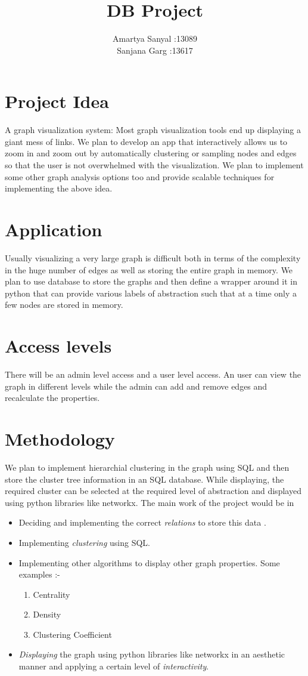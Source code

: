 \documentclass{article}
\title{DB Project}
\author{Amartya Sanyal :13089 \\ Sanjana Garg :13617}
\begin{document}
\maketitle
\section{Project Idea}
A graph visualization system: Most graph visualization tools end up displaying a giant mess of links. We plan to develop an app that interactively allows us to zoom in and zoom out by  automatically clustering or sampling nodes and edges so that the user is not overwhelmed with the visualization. We plan to implement some other graph analysis options too and provide scalable techniques for implementing the above idea.

\section{Application}
Usually visualizing a very large graph is difficult both in terms of the complexity in the huge number of edges as well as storing the entire graph in memory. We plan to use database to store the graphs and then define a wrapper around it in python that can provide various labels of abstraction such that at a time only a few nodes are stored in memory. 

\section{Access levels}
There will be an admin level access and a user level access. An user can view the graph in different levels while the admin can add and remove edges and recalculate the properties.

\section{Methodology}
We plan to implement hierarchial clustering in the graph using SQL and then store the cluster tree information in an SQL database. While displaying, the required cluster can be selected at the required level of abstraction and displayed using python libraries like networkx. The main work of the project would be in
\begin{itemize}
\item Deciding and implementing the correct \textit{relations} to  store this data .
\item Implementing \textit{clustering} using SQL.
\item Implementing other algorithms to  display other graph properties. Some examples :-
  \begin{enumerate}
  \item Centrality
  \item Density
  \item Clustering Coefficient
  \end{enumerate}

\item \textit{Displaying} the graph using python libraries like networkx in   an aesthetic manner and applying a certain level of \textit{interactivity}.
\end{itemize}
\end{document}
